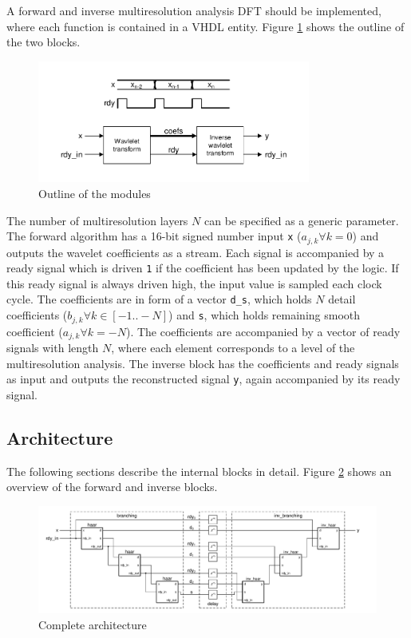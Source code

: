 \begin{refsection}
A forward and inverse multiresolution analysis DFT should be implemented, where each function is contained in a VHDL entity.
Figure \ref{fpga:fig:idea} shows the outline of the two blocks.
\begin{figure}
	\centering
	\includegraphics[width=0.8\textwidth]{papers/fpga/images/idea.pdf}
	\caption{Outline of the modules \label{fpga:fig:idea}}
\end{figure}
The number of multiresolution layers $N$ can be specified as a generic parameter.
The forward algorithm has a 16-bit signed number input \texttt{x} ($a_{j,k} \forall k=0$) and outputs the wavelet coefficients as a stream.
Each signal is accompanied by a ready signal which is driven \texttt{1} if the coefficient has been updated by the logic.
If this ready signal is always driven high, the input value is sampled each clock cycle.
The coefficients are in form of a vector \texttt{d\_s}, which holds $N$ detail coefficients ($b_{j,k} \forall k \in [-1 .. -N]$) and \texttt{s}, which holds remaining smooth coefficient ($a_{j,k} \forall k=-N$).
The coefficients are accompanied by a vector of ready signals with length $N$, where each element corresponds to a level of the multiresolution analysis.
The inverse block has the coefficients and ready signals as input and outputs the reconstructed signal \texttt{y}, again accompanied by its ready signal.

\subsection{Architecture}
The following sections describe the internal blocks in detail.
Figure \ref{fpga:fig:mainDelay} shows an overview of the forward and inverse blocks.
\begin{figure}
	\centering
	\includegraphics[width=\textwidth]{papers/fpga/images/main_delay.pdf}
	\caption{Complete architecture \label{fpga:fig:mainDelay}}
\end{figure}


\end{refsection}
